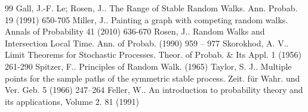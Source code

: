 \documentclass[10pt,a4paper]{amsart}
\newcommand{\1}{\mathds{1}}
\numberwithin{equation}{section}
\begin{document}
\begin{thebibliography}{99}
 Gall, J.-F. Le; Rosen, J.. The Range of Stable Random Walks. Ann. Probab. 19 (1991) 650-705
 Miller, J.. Painting a graph with competing random walks. Annals of Probability 41 (2010) 636-670
 Rosen, J.. Random Walks and Intersection Local Time. Ann. of Probab. (1990) 959 -- 977
 Skorokhod, A. V.. Limit Theorems for Stochastic Processes. Theor. of Probab. \& Its Appl. 1 (1956) 261-290
 Spitzer, F.. Principles of Random Walk. (1965)
 Taylor, S. J.. Multiple points for the sample paths of the symmetric stable process. Zeit. f{\"u}r Wahr. und Ver. Geb. 5 (1966) 247--264
 Feller, W.. An introduction to probability theory and its applications, Volume 2. 81 (1991)
\end{thebibliography}
\end{document}
